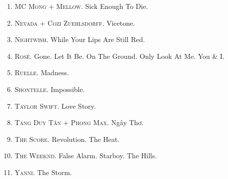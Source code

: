 \documentclass{article}
\begin{document}
\begin{enumerate}
	\item \textsc{MC Mong $+$ Mellow.} Sick Enough To Die.
	\item \textsc{Nevada $+$ Cozi Zuehlsdorff.} Vicetone.
	\item \textsc{Nightwish.} While Your Lips Are Still Red.
	\item \textsc{Ros\'e.} Gone. Let It Be. On The Ground. Only Look At Me. You \& I.
	\item \textsc{Ruelle.} Madness.
	\item \textsc{Shontelle.} Impossible.
	\item \textsc{Taylor Swift.} Love Story.
	\item \textsc{Tăng Duy Tân $+$ Phong Max.} Ngây Thơ.
	\item \textsc{The Score.} Revolution. The Heat.
	\item \textsc{The Weeknd.} False Alarm. Starboy. The Hills.
	\item \textsc{Yanni.} The Storm.
\end{enumerate}

\end{document}
